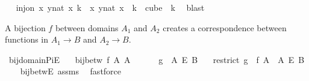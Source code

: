 \begin{isabellebody}
\ \isamarkupfalse%
\ {\isachardoublequoteopen}inj{\isacharunderscore}{\kern0pt}on\ {\isacharparenleft}{\kern0pt}{\isasymlambda}x{\isachardot}{\kern0pt}\ {\isasymlambda}y{\isasymin}{\isacharbraceleft}{\kern0pt}{\isachardot}{\kern0pt}{\isachardot}{\kern0pt}{\isacharless}{\kern0pt}{}{\isacharcolon}{\kern0pt}{\isacharcolon}{\kern0pt}nat{\isacharbraceright}{\kern0pt}{\isachardot}{\kern0pt}\ x{\isacharparenright}{\kern0pt}\ {\isacharbraceleft}{\kern0pt}{\isachardot}{\kern0pt}{\isachardot}{\kern0pt}{\isacharless}{\kern0pt}k{\isacharbraceright}{\kern0pt}\ {\isasymand}\ {\isacharparenleft}{\kern0pt}{\isasymlambda}x{\isachardot}{\kern0pt}\ {\isasymlambda}y{\isasymin}{\isacharbraceleft}{\kern0pt}{\isachardot}{\kern0pt}{\isachardot}{\kern0pt}{\isacharless}{\kern0pt}{}{\isacharcolon}{\kern0pt}{\isacharcolon}{\kern0pt}nat{\isacharbraceright}{\kern0pt}{\isachardot}{\kern0pt}\ x{\isacharparenright}{\kern0pt}\ {\isacharbackquote}{\kern0pt}\ {\isacharbraceleft}{\kern0pt}{\isachardot}{\kern0pt}{\isachardot}{\kern0pt}{\isacharless}{\kern0pt}k{\isacharbraceright}{\kern0pt}\ {\isacharequal}{\kern0pt}\ cube\ {}\ k{\isachardoublequoteclose}\ \isamarkupfalse%
\ blast\isanewline
{}\isamarkupfalse%
%
\endisatagproof
{\isafoldproof}%
%
\isadelimproof
%
\endisadelimproof
%
\begin{isamarkuptext}%
A bijection $f$ between domains $A_1$ and $A_2$ creates a correspondence between functions in $A_1 \rightarrow B$ and $A_2 \rightarrow B$.%
\end{isamarkuptext}\isamarkuptrue%
\isamarkupfalse%
\ bij{\isacharunderscore}{\kern0pt}domain{\isacharunderscore}{\kern0pt}PiE{\isacharcolon}{\kern0pt}\isanewline
\ \ \ {\isachardoublequoteopen}bij{\isacharunderscore}{\kern0pt}betw\ f\ A{}\ A{}{\isachardoublequoteclose}\ \isanewline
\ \ \ \ \ {\isachardoublequoteopen}g\ {\isasymin}\ A{}\ {\isasymrightarrow}\isactrlsub E\ B{\isachardoublequoteclose}\isanewline
\ \ \ {\isachardoublequoteopen}{\isacharparenleft}{\kern0pt}restrict\ {\isacharparenleft}{\kern0pt}g\ {\isasymcirc}\ f{\isacharparenright}{\kern0pt}\ A{}{\isacharparenright}{\kern0pt}\ {\isasymin}\ A{}\ {\isasymrightarrow}\isactrlsub E\ B{\isachardoublequoteclose}\isanewline
%
\isadelimproof
\ \ %
\endisadelimproof
%
\isatagproof
{}\isamarkupfalse%
\ bij{\isacharunderscore}{\kern0pt}betwE\ assms\ \isamarkupfalse%
\ fastforce%
\endisatagproof

\end{isabellebody}
